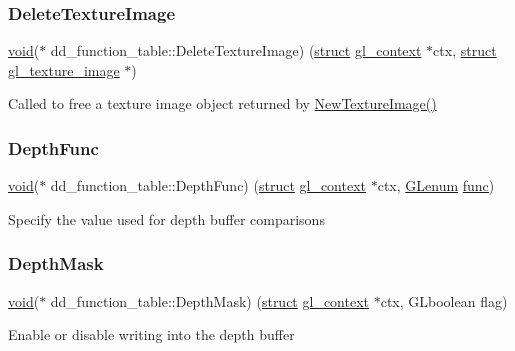 \subsubsection{\texorpdfstring{Delete\+Texture\+Image}{DeleteTextureImage}}
{\footnotesize\ttfamily \hyperlink{interfacevoid}{void}($\ast$ dd\+\_\+function\+\_\+table\+::\+Delete\+Texture\+Image) (\hyperlink{interfacestruct}{struct} \hyperlink{structgl__context}{gl\+\_\+context} $\ast$ctx, \hyperlink{interfacestruct}{struct} \hyperlink{structgl__texture__image}{gl\+\_\+texture\+\_\+image} $\ast$)}

Called to free a texture image object returned by \hyperlink{structdd__function__table_af908ae93c473fd237a2d9b98245d2006}{New\+Texture\+Image()} \mbox{\label{structdd__function__table_a5a2b32e1e03a438e9b00236cf1771933}} 
\subsubsection{\texorpdfstring{Depth\+Func}{DepthFunc}}
{\footnotesize\ttfamily \hyperlink{interfacevoid}{void}($\ast$ dd\+\_\+function\+\_\+table\+::\+Depth\+Func) (\hyperlink{interfacestruct}{struct} \hyperlink{structgl__context}{gl\+\_\+context} $\ast$ctx, \hyperlink{interfacevoid}{G\+Lenum} \hyperlink{interfacevoid}{func})}

Specify the value used for depth buffer comparisons \mbox{\label{structdd__function__table_aee0bc3435fdd8129e7e7d8d38e4a80bf}} 
\subsubsection{\texorpdfstring{Depth\+Mask}{DepthMask}}
{\footnotesize\ttfamily \hyperlink{interfacevoid}{void}($\ast$ dd\+\_\+function\+\_\+table\+::\+Depth\+Mask) (\hyperlink{interfacestruct}{struct} \hyperlink{structgl__context}{gl\+\_\+context} $\ast$ctx, G\+Lboolean flag)}

Enable or disable writing into the depth buffer \mbox{\label{structdd__function__table_affca6014f4ce79ba995be2521bedaf24}} 
